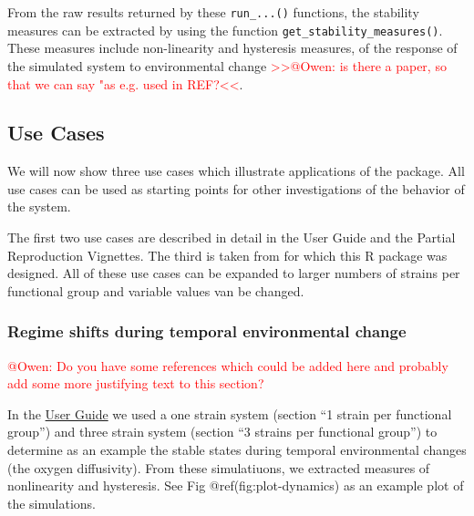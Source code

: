 \documentclass[]{elsarticle} %
\begin{document}
From the raw results returned by these \texttt{run\_...()} functions,
the stability measures can be extracted by using the function
\texttt{get\_stability\_measures()}. These measures include
non-linearity and hysteresis measures, of the response of the simulated
system to environmental change
\textcolor{red}{{>>@Owen: is there a paper, so that we can say "as e.g. used in REF?<<}}.

\hypertarget{use-cases}{%
\subsection{Use Cases}\label{use-cases}}

We will now show three use cases which illustrate applications of the
package. All use cases can be used as starting points for other
investigations of the behavior of the system.

The first two use cases are described in detail in the User Guide and
the Partial Reproduction Vignettes. The third is taken from
\citet{REF_NEEDED} for which this R package was designed. All of these
use cases can be expanded to larger numbers of strains per functional
group and variable values van be changed.

\hypertarget{regime-shifts-during-temporal-environmental-change}{%
\subsubsection{Regime shifts during temporal environmental
change}\label{regime-shifts-during-temporal-environmental-change}}

\textcolor{red}{@Owen: Do you have some references which could be added here and probably add some more justifying text to this section?}

In the \href{LINK_NEEDED}{User Guide} we used a one strain system
(section ``1 strain per functional group'') and three strain system
(section ``3 strains per functional group'') to determine as an example
the stable states during temporal environmental changes (the oxygen
diffusivity). From these simulatiuons, we extracted measures of
nonlinearity and hysteresis. See Fig @ref(fig:plot-dynamics) as an
example plot of the simulations.
\end{document}
